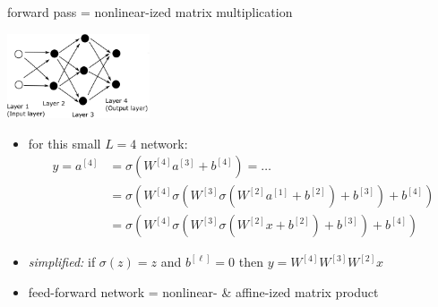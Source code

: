 \documentclass[xcolor={svgnames},
               hyperref={colorlinks,citecolor=DeepPink4,linkcolor=FireBrick,urlcolor=Maroon}]
               {beamer}
\begin{document}
\begin{frame}{forward pass = nonlinear-ized matrix multiplication}

\begin{center}
\includegraphics[height=25mm]{figs/network}
\end{center}

\begin{itemize}
\item for this small $L=4$ network:
\begin{align*}
y = a^{[4]} &= \sigma\left(W^{[4]} a^{[3]} + b^{[4]}\right) = \dots \\
            &= \sigma\left(W^{[4]} \sigma\left(W^{[3]} \sigma\left(W^{[2]} a^{[1]} + b^{[2]}\right) + b^{[3]}\right) + b^{[4]}\right) \\
            &= \sigma\left(W^{[4]} \sigma\left(W^{[3]} \sigma\left(W^{[2]} x + b^{[2]}\right) + b^{[3]}\right) + b^{[4]}\right)
\end{align*}
\item \emph{simplified:} if $\sigma(z)=z$ and $b^{[\ell]}=0$ then $y = W^{[4]} W^{[3]} W^{[2]} x$
\item feed-forward network = nonlinear- \& affine-ized matrix product
\end{itemize}
\end{frame}
\end{document}
